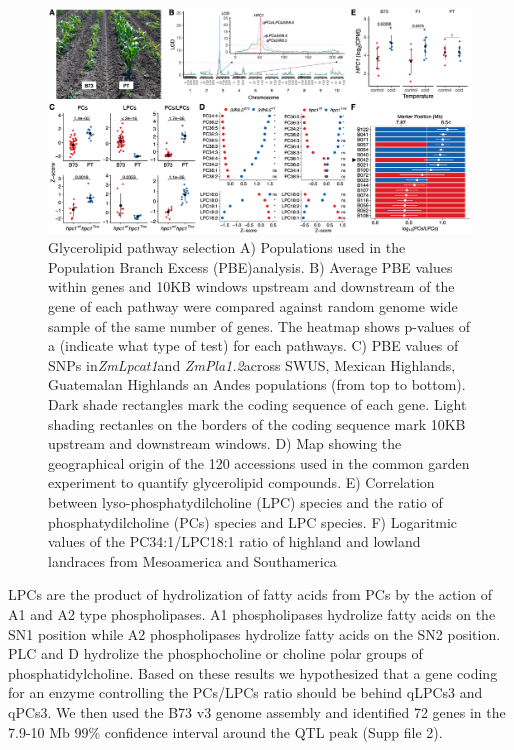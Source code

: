 \documentclass[9pt,twocolumn,twoside,lineno]{gsajnl}
\begin{document}
\begin{figure}[!ht]
\begin{center}
\includegraphics[width=0.8\paperwidth]{Figures/Fig_3.png}
\caption{Glycerolipid pathway selection 
A) Populations used in the Population Branch Excess (PBE)analysis. 
B) Average PBE values within genes and 10KB windows upstream and downstream of the gene of each pathway were compared against random genome wide sample of the same number of genes. The heatmap shows p-values of a (indicate what type of test) for each pathways. 
C) PBE values of SNPs in\textit{ZmLpcat1}and\textit{ ZmPla1.2}across SWUS, Mexican Highlands, Guatemalan Highlands an Andes populations (from top to bottom). Dark shade rectangles mark the coding sequence of each gene. Light shading rectanles on the borders of the coding sequence mark 10KB upstream and downstream windows. 
D) Map showing the geographical origin of the 120 accessions used in the common garden experiment to quantify glycerolipid compounds.
E) Correlation between  lyso-phosphatydilcholine (LPC) species and the ratio of  phosphatydilcholine (PCs) species and LPC species. 
F) Logaritmic values of the PC34:1/LPC18:1 ratio of highland and lowland landraces from Mesoamerica and Southamerica}
\label{Fig3}
\end{center}
\end{figure} 
LPCs are the product of hydrolization of fatty acids from PCs by the action of A1 and A2 type phospholipases. A1 phospholipases hydrolize fatty acids on the SN1 position while A2 phospholipases hydrolize fatty acids on the SN2 position. 
PLC and D hydrolize the phosphocholine or choline polar groups of phosphatidylcholine.  
Based on these results we hypothesized that a gene coding for an enzyme controlling the PCs/LPCs ratio should be behind  qLPCs3 and qPCs3. 
We then used the B73 v3 genome assembly and identified 72 genes in the 7.9-10 Mb 99\% confidence interval around the QTL peak (Supp file 2). 
\end{document}
